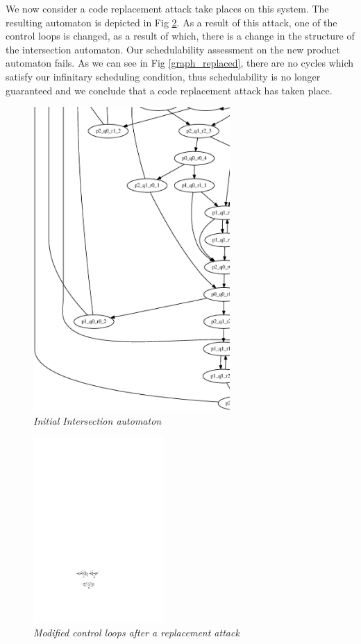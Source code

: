 \noindent
We now consider a code replacement attack take places on this system. The resulting automaton is depicted in Fig \ref{replaced}.
As a result of this attack, one of the control loops is changed, as a result of which, there is a change in the structure of the intersection automaton. Our schedulability assessment on the new product automaton fails. As we can see in Fig \ref{graph_replaced}, there are no cycles which satisfy our infinitary scheduling condition, thus schedulability is no longer guaranteed and we conclude that a code replacement attack has taken place.

\begin{figure}
\begin{center}
\includegraphics[width= 75mm]{graph.eps}
\end{center}
\caption{{\em Initial Intersection automaton}}
\label{state-transition}
\end{figure}

\begin{figure}
\begin{center}
\includegraphics[width= 50mm]{replaced.pdf}
\end{center}
\caption{{\em Modified control loops after a replacement attack}}
\label{replaced}
\end{figure}


